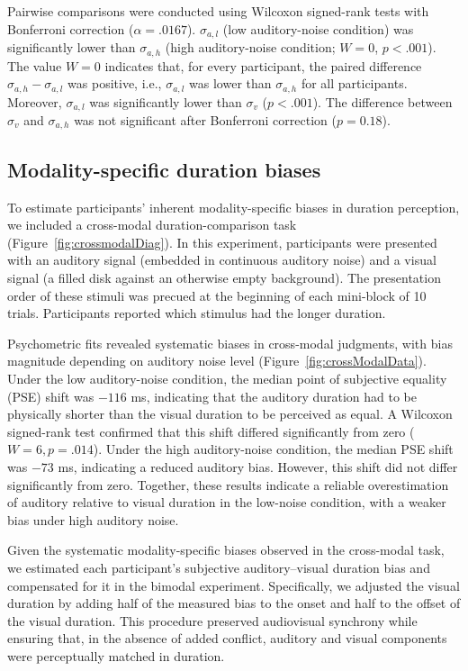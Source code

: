 \documentclass{jov}
\begin{document}
Pairwise comparisons were conducted using Wilcoxon signed-rank tests with Bonferroni correction ($\alpha = .0167$). $\sigma_{a,l}$ (low auditory-noise condition) was significantly lower than $\sigma_{a,h}$ (high auditory-noise condition; $W = 0$, $p < .001$). The value $W = 0$ indicates that, for every participant, the paired difference $\sigma_{a,h} - \sigma_{a,l}$ was positive, i.e., $\sigma_{a,l}$ was lower than $\sigma_{a,h}$ for all participants.  Moreover, $\sigma_{a,l}$ was significantly lower than $\sigma_v$ ($p < .001$). The difference between $\sigma_v$ and $\sigma_{a,h}$ was not significant after Bonferroni correction ($p = 0.18$).

\subsection{Modality-specific duration biases}

To estimate participants' inherent modality-specific biases in duration perception, we included a cross-modal duration-comparison task (Figure~\ref{fig:crossmodalDiag}). In this experiment, participants were presented with an auditory signal (embedded in continuous auditory noise) and a visual signal (a filled disk against an otherwise empty background). The presentation order of these stimuli was precued at the beginning of each mini-block of 10 trials. Participants reported which stimulus had the longer duration.

Psychometric fits revealed systematic biases in cross-modal judgments, with bias magnitude depending on auditory noise level (Figure~\ref{fig:crossModalData}). Under the low auditory-noise condition, the median point of subjective equality (PSE) shift was $-116$ ms, indicating that the auditory duration had to be physically shorter than the visual duration to be perceived as equal. A Wilcoxon signed-rank test confirmed that this shift differed significantly from zero ($W = 6, p = .014$). Under the high auditory-noise condition, the median PSE shift was $-73$ ms, indicating a reduced auditory bias. However, this shift did not differ significantly from zero. Together, these results indicate a reliable overestimation of auditory relative to visual duration in the low-noise condition, with a weaker bias under high auditory noise.

Given the systematic modality-specific biases observed in the cross-modal task, we estimated each participant's subjective auditory--visual duration bias and compensated for it in the bimodal experiment. Specifically, we adjusted the visual duration by adding half of the measured bias to the onset and half to the offset of the visual duration. This procedure preserved audiovisual synchrony while ensuring that, in the absence of added conflict, auditory and visual components were perceptually matched in duration. 
\end{document}
